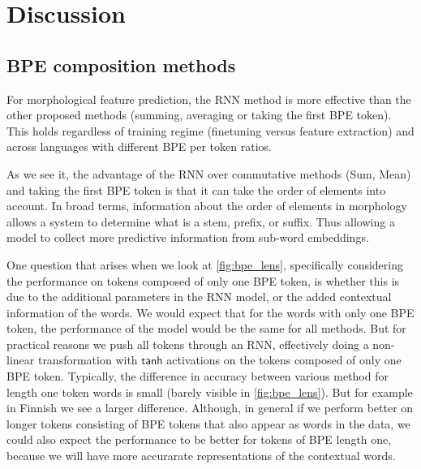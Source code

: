 \documentclass[11pt]{article}
\newcommand\adam[1]{(\textbf{Adam:} #1)}
\begin{document}
	
	
	\section{Discussion}

    \subsection{BPE composition methods}
        For morphological feature prediction, the RNN method is more
     effective than the other proposed methods (summing, averaging or
     taking the first BPE token). This holds regardless of training
     regime (finetuning versus feature extraction) and across
     languages with different BPE per token ratios.
    
                 As we see it, the advantage of the RNN over
     commutative methods (Sum, Mean) and taking the first BPE token is
     that it can take the order of elements into account. In broad
     terms, information about the order of elements in morphology
     allows a system to determine what is a stem, prefix, or suffix.
      Thus allowing a model to collect more predictive information
     from sub-word embeddings.
    


    

               One question that arises when we look at
     \cref{fig:bpe_lens}, specifically considering the performance on
     tokens composed of only one BPE token, is whether this is due to
     the additional parameters in the RNN model, or the added
     contextual information of the words. We would expect that for the
     words with only one BPE token, the performance of the model would
     be the same for all methods. But for practical reasons we push
     all tokens through an RNN, effectively doing a non-linear
     transformation with $\mathsf{tanh}$ activations on the tokens
     composed of only one BPE token.
                Typically, the difference in accuracy between various
     method for length one token words is small (barely visible in
     \cref{fig:bpe_lens}). But for example in Finnish we see a larger
     difference. Although, in general if we perform better on longer
     tokens consisting of BPE tokens that also appear as words in the
     data, we could also expect the performance to be better for
     tokens of BPE length one, because we will have more accurarate
     representations of the contextual words.
\end{document}
